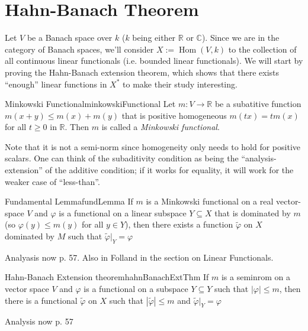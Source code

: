 \documentclass[oneside]{book}
\newcommand{\R}{\mathbb{R}}
\newcommand{\C}{\mathbb{C}}
\newcommand{\sse}{\subseteq}
\renewcommand{\phi}{\varphi}
\newcommand{\Hom}{\operatorname{Hom}}
\begin{document}
\section{Hahn-Banach Theorem}\label{sec:banDualSp}

Let $V$ be a Banach space over $k$ ($k$ being either $\R$ or $\C$). Since we are in the category of Banach spaces, we'll
consider $X := \Hom(V, k)$ to the collection of all continuous linear functionals (i.e. bounded linear functionals). We
will start by proving the Hahn-Banach extension theorem, which shows that there exists ``enough'' linear functions in
$X^*$ to make their study interesting.

\begin{defn}{Minkowski Functional}{minkowskiFunctional}
	Let $m: V \to \R$ be a subatitive function $m(x+y) \le m(x) + m(y)$ that is positive homogeneous $m(tx)
	= tm(x)$ for all $t \ge 0$ in $\R$. Then $m$ is called a \emph{Minkowski functional}.
\end{defn}

Note that it is not a semi-norm since homogeneity only needs to hold for positive scalars. One can think of
the subaditivity condition as being the ``analysis-extension'' of the additive condition; if it works for
equality, it will work for the weaker case of ``less-than''.

\begin{lem}{Fundamental Lemma}{fundLemma}
	If $m$ is a Minkowski functional on a real vector-space $V$ and $\phi$ is a functional on a linear subspace $Y
	\sse X$ that is dominated by $m$ (so $\phi(y) \le m(y)$ for all $y \in Y$), then there exists a function
	$\tilde{\phi}$ on $X$ dominated by $M$ such that $\tilde{\phi}|_{Y} = \phi$
\end{lem}

\begin{Proof}
	Analyasis now p. 57. Also in Folland in the section on Linear Functionals.
\end{Proof}



\begin{thm}{Hahn-Banach Extension theorem}{hahnBanachExtThm}
	If $m$ is a seminrom on a vector space $V$ and $\phi$ is a functional on a subspace $Y \sse Y$ such that
	$|\phi| \le m$, then there  is a functional $\tilde{\phi}$ on $X$ such that $|\tilde{\phi}| \le m$ and
	$\tilde{\phi}|_{Y} = \phi$
\end{thm}

\begin{Proof}
	Analysis now p. 57
\end{Proof}
\end{document}
